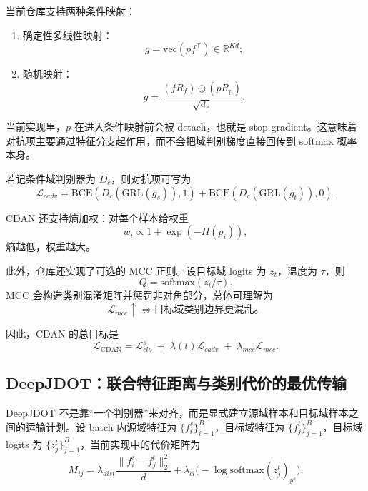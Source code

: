 \documentclass[12pt,a4paper]{ctexart}
\newcommand{\R}{\mathbb{R}}
\newcommand{\softmax}{\mathrm{softmax}}
\begin{document}
当前仓库支持两种条件映射：
\begin{enumerate}[leftmargin=2em]
  \item 确定性多线性映射：
  \begin{equation}
  g=\mathrm{vec}(p f^\top)\in \R^{Kd};
  \end{equation}
  \item 随机映射：
  \begin{equation}
  g=\frac{(fR_f)\odot(pR_p)}{\sqrt{d_r}}.
  \end{equation}
\end{enumerate}

当前实现里，$p$ 在进入条件映射前会被 detach，也就是 stop-gradient。这意味着对抗项主要通过特征分支起作用，而不会把域判别梯度直接回传到 softmax 概率本身。

若记条件域判别器为 $D_c$，则对抗项可写为
\begin{equation}
\mathcal{L}_{cadv}
=
\mathrm{BCE}(D_c(\mathrm{GRL}(g_s)),1)
+
\mathrm{BCE}(D_c(\mathrm{GRL}(g_t)),0).
\end{equation}

CDAN 还支持熵加权：对每个样本给权重
\begin{equation}
w_i \propto 1+\exp(-H(p_i)),
\end{equation}
熵越低，权重越大。

此外，仓库还实现了可选的 MCC 正则。设目标域 logits 为 $z_t$，温度为 $\tau$，则
\begin{equation}
Q=\softmax(z_t/\tau).
\end{equation}
MCC 会构造类别混淆矩阵并惩罚非对角部分，总体可理解为
\begin{equation}
\mathcal{L}_{mcc}
\uparrow
\Longleftrightarrow
\text{目标域类别边界更混乱。}
\end{equation}

因此，CDAN 的总目标是
\begin{equation}
\mathcal{L}_{\mathrm{CDAN}}
=
\mathcal{L}_{cls}^s
\;+\;
\lambda(t)\mathcal{L}_{cadv}
\;+\;
\lambda_{mcc}\mathcal{L}_{mcc}.
\end{equation}

\subsection{DeepJDOT：联合特征距离与类别代价的最优传输}

DeepJDOT 不是靠“一个判别器”来对齐，而是显式建立源域样本和目标域样本之间的运输计划。设 batch 内源域特征为 $\{f_i^s\}_{i=1}^B$，目标域特征为 $\{f_j^t\}_{j=1}^B$，目标域 logits 为 $\{z_j^t\}_{j=1}^B$，当前实现中的代价矩阵为
\begin{equation}
M_{ij}
=
\lambda_{dist}\frac{\|f_i^s-f_j^t\|_2^2}{d}
+
\lambda_{cl}\big(-\log \softmax(z_j^t)_{y_i^s}\big).
\end{equation}
\end{document}

